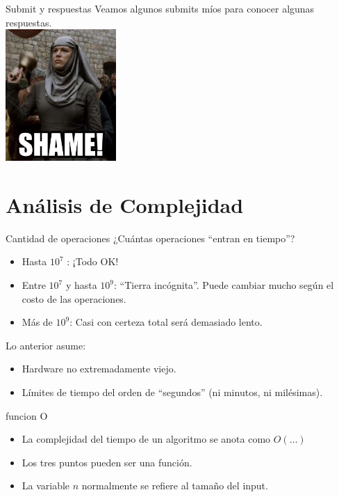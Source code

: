 \documentclass{beamer}
\begin{document}
\begin{frame}{Submit y respuestas}
    \centering
    Veamos algunos submits míos para conocer algunas respuestas.\\
    \includegraphics[height=5cm]{img/shame.jpg}
\end{frame}

\section{Análisis de Complejidad}
\begin{frame}{Cantidad de operaciones}
    ¿Cuántas operaciones ``entran en tiempo''?
    \begin{itemize}
        \item Hasta $10^7$ : ¡Todo OK!
        \item Entre $10^7$ y hasta $10^9$: ``Tierra incógnita''. Puede cambiar mucho según el costo de las operaciones.
        \item Más de $10^9$: Casi con certeza total será demasiado lento.
    \end{itemize}
    Lo anterior asume:
        \begin{itemize}
            \item Hardware no extremadamente viejo.
            \item Límites de tiempo del orden de ``segundos'' (ni minutos, ni milésimas).
        \end{itemize}
\end{frame}

\begin{frame}{funcion O}
    \begin{itemize}
        \item La complejidad del tiempo de un algoritmo se anota como $O(\dots)$
        \item Los tres puntos pueden ser una función.
        \item La variable $n$ normalmente se refiere al tamaño del input.
    \end{itemize}
\end{frame}
\end{document}
